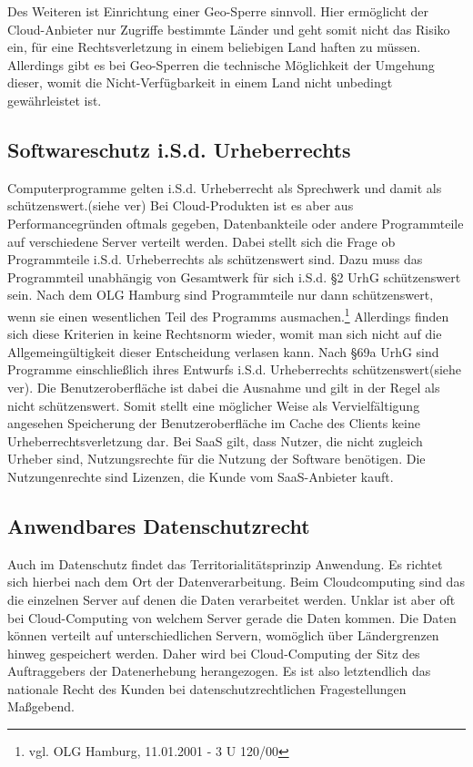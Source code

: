 Des Weiteren ist Einrichtung einer Geo-Sperre sinnvoll. Hier erm\"oglicht der Cloud-Anbieter nur Zugriffe bestimmte L\"ander und geht somit nicht das Risiko ein, f\"ur eine Rechtsverletzung in einem beliebigen Land haften zu m\"ussen. Allerdings gibt es bei Geo-Sperren die technische M\"oglichkeit der Umgehung dieser, womit die Nicht-Verf\"ugbarkeit in einem Land nicht unbedingt gew\"ahrleistet ist.

 \subsection{Softwareschutz i.S.d. Urheberrechts}
Computerprogramme gelten i.S.d. Urheberrecht als Sprechwerk und damit als sch\"utzenswert.(siehe {ver}) Bei Cloud-Produkten ist es aber aus Performancegr\"unden oftmals gegeben, Datenbankteile oder andere Programmteile auf verschiedene Server verteilt werden. Dabei stellt sich die Frage ob Programmteile i.S.d. Urheberrechts als sch\"utzenswert sind. Dazu muss das Programmteil unabh\"angig von Gesamtwerk f\"ur sich i.S.d. §2 UrhG sch\"utzenswert sein. Nach dem OLG Hamburg sind Programmteile nur dann sch\"utzenswert, wenn sie einen wesentlichen Teil des Programms ausmachen.\footnote{vgl. OLG Hamburg, 11.01.2001 - 3 U 120/00} Allerdings finden sich diese Kriterien in keine Rechtsnorm wieder, womit man sich nicht auf die Allgemeing\"ultigkeit dieser Entscheidung verlasen kann.\newline
Nach §69a UrhG sind Programme einschlie{\ss}lich ihres Entwurfs i.S.d. Urheberrechts sch\"utzenswert(siehe {ver}). Die Benutzeroberfl\"ache ist dabei die Ausnahme und gilt in der Regel als nicht sch\"utzenswert. Somit stellt eine m\"oglicher Weise als Vervielf\"altigung angesehen Speicherung der Benutzeroberfl\"ache im Cache des Clients keine Urheberrechtsverletzung dar.\newline
Bei SaaS gilt, dass Nutzer, die nicht zugleich Urheber sind, Nutzungsrechte f\"ur die Nutzung der Software ben\"otigen. Die Nutzungenrechte sind Lizenzen, die Kunde vom SaaS-Anbieter kauft.   

    \subsection{Anwendbares Datenschutzrecht}
Auch im Datenschutz findet das Territorialit\"atsprinzip Anwendung. Es richtet sich hierbei nach dem Ort der Datenverarbeitung. Beim Cloudcomputing sind das die einzelnen Server auf denen die Daten verarbeitet werden. Unklar ist aber oft bei Cloud-Computing von welchem Server gerade die Daten kommen. Die Daten k\"onnen verteilt auf unterschiedlichen Servern, wom\"oglich \"uber L\"andergrenzen hinweg gespeichert werden. Daher wird bei Cloud-Computing der Sitz des Auftraggebers der Datenerhebung herangezogen. Es ist also letztendlich das nationale Recht des Kunden bei datenschutzrechtlichen Fragestellungen Ma{\ss}gebend.

